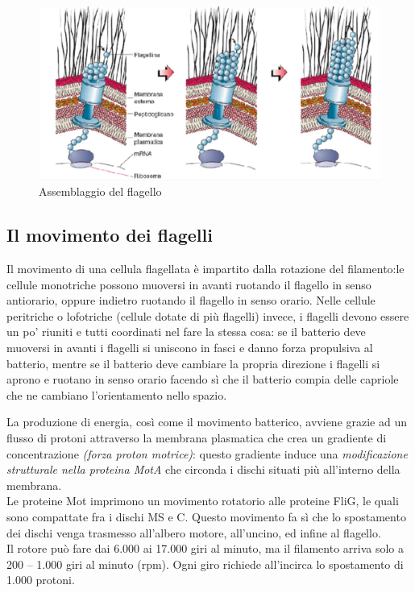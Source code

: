 \documentclass[11pt]{book}
\begin{document}
\begin{figure}[htp]
\centering
\includegraphics[scale=0.5]{img/Assemblaggio flagello.png}
\caption{Assemblaggio del flagello}
\label{}
\end{figure}

\clearpage
\subsection{Il movimento dei flagelli}

Il movimento di una cellula flagellata è impartito dalla rotazione del filamento:le cellule monotriche possono muoversi in avanti ruotando il flagello in senso antiorario, oppure indietro ruotando il flagello in senso orario. Nelle cellule peritriche o lofotriche (cellule dotate di più flagelli) invece, i flagelli devono essere un po’ riuniti e tutti coordinati nel fare la stessa cosa: se il batterio deve muoversi in avanti i flagelli si uniscono in fasci e danno forza propulsiva al batterio, mentre se il batterio deve cambiare la propria direzione i flagelli si aprono e ruotano in senso orario facendo sì che il batterio compia delle capriole che ne cambiano l’orientamento nello spazio.

\vspace{1em}
La produzione di energia, così come il movimento batterico, avviene grazie ad un flusso di protoni attraverso la membrana plasmatica che crea un gradiente di concentrazione \emph{(forza proton motrice)}: questo gradiente induce una \emph{modificazione strutturale nella proteina MotA} che circonda i dischi situati più all’interno della membrana.\\
Le proteine Mot imprimono un movimento rotatorio alle proteine FliG, le quali sono compattate fra i dischi MS e C. Questo movimento fa sì che lo spostamento dei dischi venga trasmesso all’albero motore, all’uncino, ed infine al flagello.\\
Il rotore può fare dai 6.000 ai 17.000 giri al minuto, ma il filamento arriva solo a 200 – 1.000 giri al minuto (rpm). Ogni giro richiede all’incirca lo spostamento di 1.000 protoni.
\end{document}
